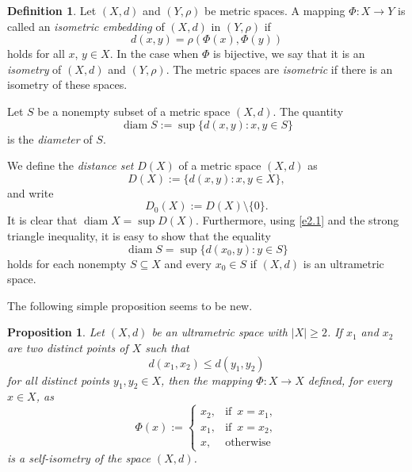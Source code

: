 \documentclass[11pt]{article}
\newtheorem{proposition}[theorem]{Proposition}
\theoremstyle{definition}
\newtheorem{definition}[theorem]{Definition}
\theoremstyle{remark}
\numberwithin{equation}{section}
\begin{document}
\begin{definition}\label{d2.2}
Let \((X, d)\) and \((Y, \rho)\) be metric spaces. A mapping \(\Phi \colon X \to Y\) is called an {\it isometric embedding} of \((X, d)\) in \((Y, \rho)\) if
\[
d(x,y) = \rho(\Phi(x), \Phi(y))
\]
holds for all \(x\), \(y \in X\). In the case when \(\Phi\) is bijective, we say that it is an {\it isometry} of \((X, d)\) and \((Y, \rho)\). The metric spaces are {\it isometric} if there is an isometry of these spaces.
\end{definition}





Let \(S\) be a nonempty subset of a metric space \((X, d)\). The quantity
\begin{equation}\label{e2.1}
\operatorname{diam} S :=\sup\{d(x,y) \colon x, y\in S\}
\end{equation}
is the \emph{diameter} of \(S\). 

We define the \emph{distance set} \(D(X)\) of a metric space \((X,d)\) as
\[
D(X) :=  \{d(x, y) \colon x, y \in X\},
\]
and write 
\begin{equation}
    \label{smwuu}
D_0(X):=D(X)\setminus \{0\}.
\end{equation}
It is clear that \(\operatorname{diam} X = \sup D(X)\). Furthermore, using \eqref{e2.1} and the strong triangle inequality, it is easy to show 
that the equality
\begin{equation}
    \label{lam45}
\operatorname{diam} S = \sup \{ d(x_0,y) \colon y \in S \}
\end{equation}
holds for each nonempty \(S \subseteq X\) and every \(x_0 \in S\) if \((X,d)\) is an ultrametric space.




The following simple proposition seems to be new.  
\begin{proposition}\label{kkigds}
Let $(X,d)$ be an ultrametric space with $|X|\geq 2$.  
If $x_1$ and $x_2$ are two distinct points of $X$ such that
\begin{equation}
    \label{pemmbv1}
d(x_1,x_2) \leq d(y_1,y_2) 
\end{equation}
for all distinct points $y_1,y_2 \in X$,  
then the mapping $\Phi : X \to X$ defined, for every $x\in X$, as  
\begin{equation}
    \label{pemmbv2}
\Phi(x) :=
\begin{cases}
x_2, &  \text{if} \,\,\,x = x_1, \\[6pt]
x_1, &  \text{if} \,\,\,x = x_2, \\[6pt]
x,   & \text{otherwise}
\end{cases} 
\end{equation}
is a self-isometry of the space $(X,d)$.  
\end{proposition}
\end{document}
